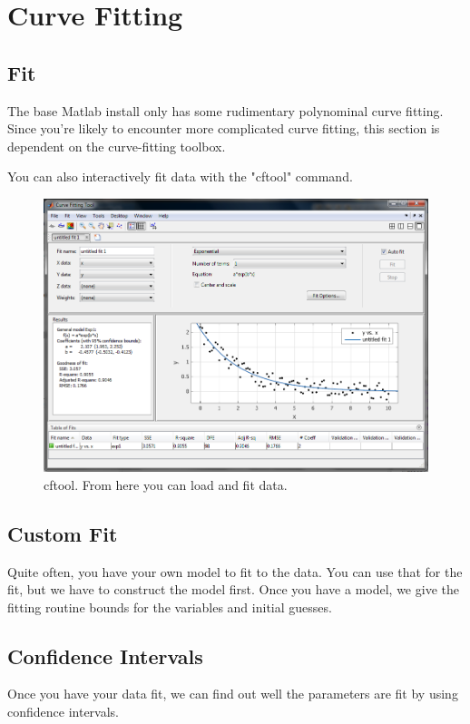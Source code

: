 
\pagebreak
\section{Curve Fitting}

\subsection{Fit}
The base Matlab install only has some rudimentary polynominal curve fitting.
 Since you're likely to encounter more complicated curve fitting, this section is dependent on the curve-fitting toolbox.

\begin{quote}

\end{quote}

You can also interactively fit data with the "cftool" command.

\begin{figure}[ht!]
\centering
\includegraphics[width=120mm]{img/cftool.png}
\caption{cftool. From here you can load and fit data.}
\label{guiload}
\end{figure}

\pagebreak
\subsection{Custom Fit}
Quite often, you have your own model to fit to the data.
 You can use that for the fit, but we have to construct the model first.
 Once you have a model, we give the fitting routine bounds for the variables and initial guesses.

\begin{quote}
 
\end{quote}

\pagebreak
\subsection{Confidence Intervals}
Once you have your data fit, we can find out well the parameters are fit by using confidence intervals.

\begin{quote}
 
\end{quote}
